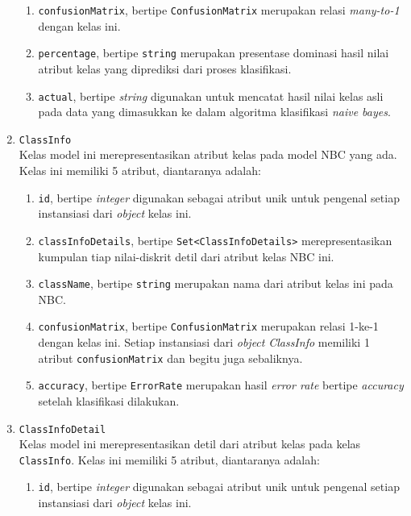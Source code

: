 \begin{enumerate}
\begin{enumerate}
		\item \texttt{confusionMatrix}, bertipe \texttt{ConfusionMatrix} merupakan relasi \textit{many-to-1} dengan kelas ini.

		\item \texttt{percentage}, bertipe \texttt{string} merupakan presentase dominasi hasil nilai atribut kelas yang diprediksi dari proses klasifikasi.
		

		\item \texttt{actual}, bertipe \textit{string} digunakan untuk mencatat hasil nilai kelas asli pada data yang dimasukkan ke dalam algoritma klasifikasi \textit{naive bayes}.

	\end{enumerate}


	\item \texttt{ClassInfo}\\
	Kelas model ini merepresentasikan atribut kelas pada model NBC yang ada. Kelas ini memiliki 5 atribut, diantaranya adalah:
	\begin{enumerate}
		\item \texttt{id}, bertipe \textit{integer} digunakan sebagai atribut unik untuk pengenal setiap instansiasi dari \textit{object} kelas ini.
		
		\item \texttt{classInfoDetails}, bertipe \texttt{Set<ClassInfoDetails>} merepresentasikan kumpulan tiap nilai-diskrit detil dari atribut kelas NBC ini.
		
		\item \texttt{className}, bertipe \texttt{string} merupakan nama dari atribut kelas ini pada NBC.
		
		\item \texttt{confusionMatrix}, bertipe \texttt{ConfusionMatrix} merupakan relasi 1-ke-1 dengan kelas ini. Setiap instansiasi dari \textit{object} \textit{ClassInfo} memiliki 1 atribut \texttt{confusionMatrix} dan begitu juga sebaliknya.
		
		\item \texttt{accuracy}, bertipe \texttt{ErrorRate} merupakan hasil \textit{error rate} bertipe \textit{accuracy} setelah klasifikasi dilakukan.
		
		
	\end{enumerate}

	\item \texttt{ClassInfoDetail}\\
	Kelas model ini merepresentasikan detil dari atribut kelas pada kelas \texttt{ClassInfo}. Kelas ini memiliki 5 atribut, diantaranya adalah:
	\begin{enumerate}
		\item \texttt{id}, bertipe \textit{integer} digunakan sebagai atribut unik untuk pengenal setiap instansiasi dari \textit{object} kelas ini.
		

\end{enumerate}
\end{enumerate}
